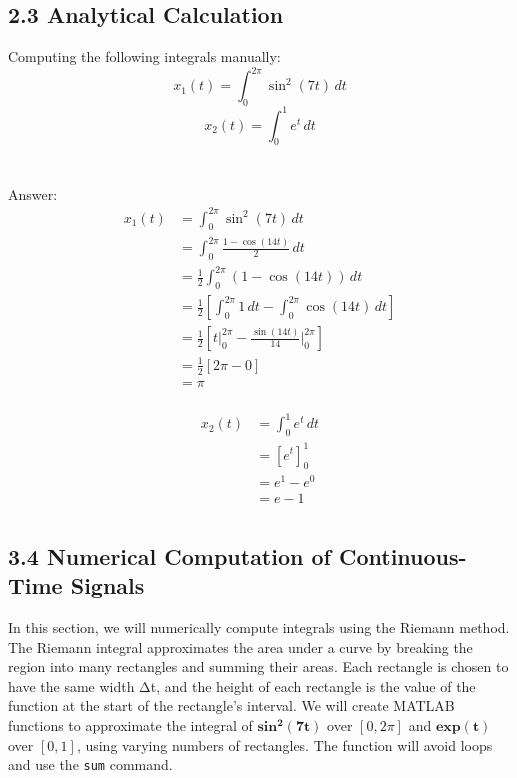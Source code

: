 \documentclass[a4paper,12pt,fleqn]{article}
\begin{document}
\subsection*{2.3 Analytical Calculation}
Computing the following integrals manually:
\begin{equation*}
x_1(t) = \int_0^{2\pi} \sin^2(7t) \, dt
\end{equation*}
\begin{equation*}
x_2(t) = \int_0^1 e^t \, dt
\end{equation*}
\\ \\
Answer:
\newline
\begin{equation}
\begin{split}
x_1(t) & = \int_{0}^{2\pi} \sin^2(7t) \, dt \\
& = \int_{0}^{2\pi} \frac{1 - \cos(14t)}{2} \, dt \\
& = \frac{1}{2} \int_{0}^{2\pi} (1 - \cos(14t)) \, dt \\
& = \frac{1}{2} \left[ \int_{0}^{2\pi} 1 \, dt - \int_{0}^{2\pi} \cos(14t) \, dt \right] \\
& = \frac{1}{2} \left[ t \Big|_{0}^{2\pi} - \frac{\sin(14t)}{14} \Big|_{0}^{2\pi} \right] \\
& = \frac{1}{2} \left[ 2\pi - 0 \right] \\
& = \pi \\
\end{split}
\end{equation}

\begin{equation}
\begin{split}
x_2(t) & = \int_{0}^{1} e^t\,dt\\
  & = \left[ e^t \right]_{0}^{1}\\
  & = e^1 - e^0\\
  & = e - 1\\
\end{split}
\end{equation}
\newpage

\subsection*{3.4  Numerical Computation of Continuous-Time Signals}
In this section, we will numerically compute integrals using the Riemann method. The Riemann integral approximates the area under a curve by breaking the region into many rectangles and summing their areas. Each rectangle is chosen to have the same width Δt, and the height of each rectangle is the value of the function at the start of the rectangle’s interval. We will create MATLAB functions to approximate the integral of \( \mathbf{sin^2(7t)} \) over \([0, 2\pi]\) and \( \mathbf{exp(t)} \) over \([0, 1]\), using varying numbers of rectangles. The function will avoid loops and use the \texttt{sum} command. 
\end{document}
